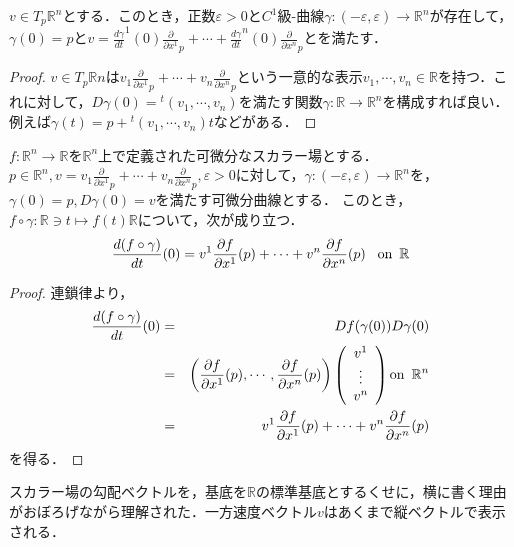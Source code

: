 \documentclass[uplatex, 12pt, dvipdfmx]{jsarticle}
\begin{document}
\begin{lemma}
    $v\in T_p\mathbb{R}^n$とする．このとき，正数$\varepsilon>0$と$C^1$級-曲線$\gamma:(-\varepsilon,\varepsilon)\to\mathbb{R}^n$が存在して，$\gamma(0)=p$と$v=\frac{d\gamma}{dt}^1(0)\frac{\partial}{\partial x^1}_p + \cdots + \frac{d\gamma}{dt}^n(0)\frac{\partial}{\partial x^n}_p$とを満たす．
\end{lemma}
\begin{proof}
    $v\in T_p\mathbb{R}n$は$v_1\frac{\partial}{\partial x^1}_p + \cdots + v_n\frac{\partial}{\partial x^n}_p$という一意的な表示$v_1,\cdots,v_n\in\mathbb{R}$を持つ．これに対して，$D\gamma(0)={}^t\!(v_1,\cdots,v_n)$を満たす関数$\gamma:\mathbb{R}\to\mathbb{R}^n$を構成すれば良い．
    例えば$\gamma(t)=p+{}^t\!(v_1,\cdots,v_n)t$などがある．
\end{proof}

\begin{proposition}\label{prop-direction-derivative}
    $f:\mathbb{R}^n\to\mathbb{R}$を$\mathbb{R}^n$上で定義された可微分なスカラー場とする．$p\in\mathbb{R}^n, v=v_1\frac{\partial}{\partial x^1}_p + \cdots + v_n\frac{\partial}{\partial x^n}_p, \varepsilon>0$に対して，$\gamma:(-\varepsilon,\varepsilon)\to\mathbb{R}^n$を，$\gamma(0)=p, D\gamma(0)=v$を満たす可微分曲線とする．
    このとき，$f\circ\gamma:\mathbb{R}\ni t\mapsto f(t)\mathbb{R}$について，次が成り立つ．
    \[ \frac{d(f\circ\gamma)}{dt}(0) = v^1\frac{\partial f}{\partial x^1}(p) + \cdots + v^n\frac{\partial f}{\partial x^n}(p) \hspace{3mm} \mathrm{on}\hspace{0.5em} \mathbb{R} \]
\end{proposition}
\begin{proof}
    連鎖律より，
    \begin{eqnarray*}
        \frac{d (f\circ\gamma)}{dt}(0) &=& Df(\gamma (0))D\gamma(0) \\
        &=& \left( \frac{\partial f}{\partial x^1}(p),\cdots,\frac{\partial f}{\partial x^n}(p) \right)\left( \begin{array}{c}
            v^1 \\ \vdots \\ v^n
        \end{array} \right) \mathrm{on}\hspace{0.5em}\mathbb{R}^n\\
        &=& v^1 \frac{\partial f}{\partial x^1}(p)+\cdots +v^n\frac{\partial f}{\partial x^n}(p)
    \end{eqnarray*}
    を得る．
\end{proof}
スカラー場の勾配ベクトルを，基底を$\mathbb{R}$の標準基底とするくせに，横に書く理由がおぼろげながら理解された．一方速度ベクトル$v$はあくまで縦ベクトルで表示される．
\end{document}
